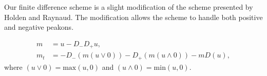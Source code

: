 Our finite difference scheme is a slight modification of the scheme presented by Holden and Raynaud. The modification allows the scheme to handle both positive and negative peakons. 

\begin{align}
m &= u - D_{-}D_{+}u, \\
m_t &= -D_{-}(m(u \vee 0)) -D_{+}(m(u \wedge 0)) - mD(u),
\end{align}
where $(u \vee 0) = \text{max}(u,0)$ and $(u \wedge 0) = \text{min}(u,0)$.